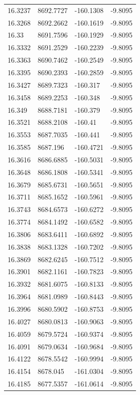 \begin{table}[H]
\begin{tabular}{llll}
16.3237 & 8692.7727 & -160.1308 & -9.8095 \\
16.3268 & 8692.2662 & -160.1619 & -9.8095 \\
16.33 & 8691.7596 & -160.1929 & -9.8095 \\
16.3332 & 8691.2529 & -160.2239 & -9.8095 \\
16.3363 & 8690.7462 & -160.2549 & -9.8095 \\
16.3395 & 8690.2393 & -160.2859 & -9.8095 \\
16.3427 & 8689.7323 & -160.317 & -9.8095 \\
16.3458 & 8689.2253 & -160.348 & -9.8095 \\
16.349 & 8688.7181 & -160.379 & -9.8095 \\
16.3521 & 8688.2108 & -160.41 & -9.8095 \\
16.3553 & 8687.7035 & -160.441 & -9.8095 \\
16.3585 & 8687.196 & -160.4721 & -9.8095 \\
16.3616 & 8686.6885 & -160.5031 & -9.8095 \\
16.3648 & 8686.1808 & -160.5341 & -9.8095 \\
16.3679 & 8685.6731 & -160.5651 & -9.8095 \\
16.3711 & 8685.1652 & -160.5961 & -9.8095 \\
16.3743 & 8684.6573 & -160.6272 & -9.8095 \\
16.3774 & 8684.1492 & -160.6582 & -9.8095 \\
16.3806 & 8683.6411 & -160.6892 & -9.8095 \\
16.3838 & 8683.1328 & -160.7202 & -9.8095 \\
16.3869 & 8682.6245 & -160.7512 & -9.8095 \\
16.3901 & 8682.1161 & -160.7823 & -9.8095 \\
16.3932 & 8681.6075 & -160.8133 & -9.8095 \\
16.3964 & 8681.0989 & -160.8443 & -9.8095 \\
16.3996 & 8680.5902 & -160.8753 & -9.8095 \\
16.4027 & 8680.0813 & -160.9063 & -9.8095 \\
16.4059 & 8679.5724 & -160.9374 & -9.8095 \\
16.4091 & 8679.0634 & -160.9684 & -9.8095 \\
16.4122 & 8678.5542 & -160.9994 & -9.8095 \\
16.4154 & 8678.045 & -161.0304 & -9.8095 \\
16.4185 & 8677.5357 & -161.0614 & -9.8095 \\

\end{tabular}
\end{table}
